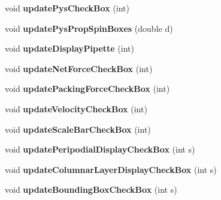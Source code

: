 \begin{DoxyCompactItemize}
\item 
\hypertarget{classMainWindow_a933538d0ccf6de1298c6e4c7ed223f38}{}void {\bfseries update\+Pys\+Check\+Box} (int)\label{classMainWindow_a933538d0ccf6de1298c6e4c7ed223f38}

\item 
\hypertarget{classMainWindow_acd6a8996cd12c70a0e0572eebb9dc24d}{}void {\bfseries update\+Pys\+Prop\+Spin\+Boxes} (double d)\label{classMainWindow_acd6a8996cd12c70a0e0572eebb9dc24d}

\item 
\hypertarget{classMainWindow_ad30193e1dac5d64c7467e576e238ce03}{}void {\bfseries update\+Display\+Pipette} (int)\label{classMainWindow_ad30193e1dac5d64c7467e576e238ce03}

\item 
\hypertarget{classMainWindow_ac6e570780295db3ff54382cbda1ea4cf}{}void {\bfseries update\+Net\+Force\+Check\+Box} (int)\label{classMainWindow_ac6e570780295db3ff54382cbda1ea4cf}

\item 
\hypertarget{classMainWindow_abf1716feb02925cadc40800ed5aa1af8}{}void {\bfseries update\+Packing\+Force\+Check\+Box} (int)\label{classMainWindow_abf1716feb02925cadc40800ed5aa1af8}

\item 
\hypertarget{classMainWindow_a0860bef7bbd9ae81c607142a8462e0a7}{}void {\bfseries update\+Velocity\+Check\+Box} (int)\label{classMainWindow_a0860bef7bbd9ae81c607142a8462e0a7}

\item 
\hypertarget{classMainWindow_af7f60ea4eea7ff11fd1f892455d86063}{}void {\bfseries update\+Scale\+Bar\+Check\+Box} (int)\label{classMainWindow_af7f60ea4eea7ff11fd1f892455d86063}

\item 
\hypertarget{classMainWindow_aee2509de2d13eedd782420cf86cd34d6}{}void {\bfseries update\+Peripodial\+Display\+Check\+Box} (int s)\label{classMainWindow_aee2509de2d13eedd782420cf86cd34d6}

\item 
\hypertarget{classMainWindow_a516111157b177a92fc5838a060f36908}{}void {\bfseries update\+Columnar\+Layer\+Display\+Check\+Box} (int s)\label{classMainWindow_a516111157b177a92fc5838a060f36908}

\item 
\hypertarget{classMainWindow_a52aa21a413bbc1f33a84f695b677f490}{}void {\bfseries update\+Bounding\+Box\+Check\+Box} (int s)\label{classMainWindow_a52aa21a413bbc1f33a84f695b677f490}


\end{DoxyCompactItemize}
